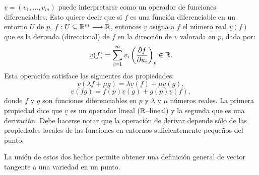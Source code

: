 \documentclass[Cursovd_portada.tex]{subfiles}
\begin{document}
$\underline{v}=(v_1,\dots ,v_m)$ puede interpretarse como un operador de funciones diferenciables. Esto quiere
decir que si $f$ es una función diferenciable en un entorno $U$ de $p$, $f:U\subseteq\mathbb{R}^m\longrightarrow\mathbb{R}$, entonces
$\underline{v}$ asigna a $f$ el número real $\underline{v}(f)$ que es la derivada (direccional) de $f$ en la
dirección de $\underline{v}$ valorada en $p$, dada por:
$$\underline{v}(f)=\sum_{i=1}^mv_i\left(\displaystyle{\frac{\partial f}{\partial u_i}}\right)_p\in\mathbb{R}.$$
\hs Esta operación satisface las siguientes dos propiedades:
$$\underline{v}(\lambda f+\mu g)=\lambda\underline{v}(f)+\mu\underline{v}(g),$$
$$\underline{v}(fg)=f(p)\underline{v}(g)+g(p)\underline{v}(f),$$
donde $f$ y $g$ son funciones diferenciables en $p$ y $\lambda$ y $\mu$ números reales. La primera propiedad dice
que $\underline{v}$ es un operador lineal ($\mathbb{R}$--lineal) y la segunda que es una derivación. Debe hacerse notar
que la operación de derivar depende sólo de las propiedades locales de las funciones en entornos suficientemente
peque\~{n}os del punto.
\par
La unión de estos dos hechos permite obtener una definición general de vector tangente a una variedad en un punto.
\end{document}
